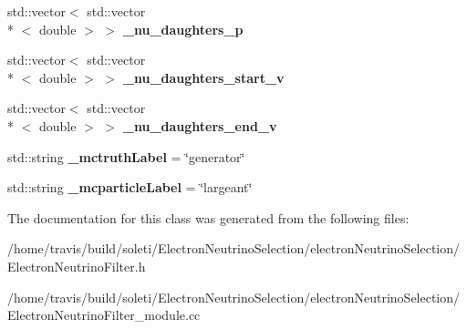 \begin{DoxyCompactItemize}
\item 
\hypertarget{classlee_1_1ElectronNeutrinoFilter_adadc9f67a7081c711beb31212f756c7e}{std\-::vector$<$ std\-::vector\\*
$<$ double $>$ $>$ {\bfseries \-\_\-nu\-\_\-daughters\-\_\-p}}\label{classlee_1_1ElectronNeutrinoFilter_adadc9f67a7081c711beb31212f756c7e}

\item 
\hypertarget{classlee_1_1ElectronNeutrinoFilter_a7abfee2964d910a5caf074bc53389453}{std\-::vector$<$ std\-::vector\\*
$<$ double $>$ $>$ {\bfseries \-\_\-nu\-\_\-daughters\-\_\-start\-\_\-v}}\label{classlee_1_1ElectronNeutrinoFilter_a7abfee2964d910a5caf074bc53389453}

\item 
\hypertarget{classlee_1_1ElectronNeutrinoFilter_a7877ffa0e396de6907ed7dca3e5c5e1d}{std\-::vector$<$ std\-::vector\\*
$<$ double $>$ $>$ {\bfseries \-\_\-nu\-\_\-daughters\-\_\-end\-\_\-v}}\label{classlee_1_1ElectronNeutrinoFilter_a7877ffa0e396de6907ed7dca3e5c5e1d}

\item 
\hypertarget{classlee_1_1ElectronNeutrinoFilter_a7b91ab5f148464be875c2eb4438d091c}{std\-::string {\bfseries \-\_\-mctruth\-Label} = \char`\"{}generator\char`\"{}}\label{classlee_1_1ElectronNeutrinoFilter_a7b91ab5f148464be875c2eb4438d091c}

\item 
\hypertarget{classlee_1_1ElectronNeutrinoFilter_af903bbd240a90b34caeb1eddf5313642}{std\-::string {\bfseries \-\_\-mcparticle\-Label} = \char`\"{}largeant\char`\"{}}\label{classlee_1_1ElectronNeutrinoFilter_af903bbd240a90b34caeb1eddf5313642}

\end{DoxyCompactItemize}


The documentation for this class was generated from the following files\-:\begin{DoxyCompactItemize}
\item 
/home/travis/build/soleti/\-Electron\-Neutrino\-Selection/electron\-Neutrino\-Selection/Electron\-Neutrino\-Filter.\-h\item 
/home/travis/build/soleti/\-Electron\-Neutrino\-Selection/electron\-Neutrino\-Selection/Electron\-Neutrino\-Filter\-\_\-module.\-cc\end{DoxyCompactItemize}
